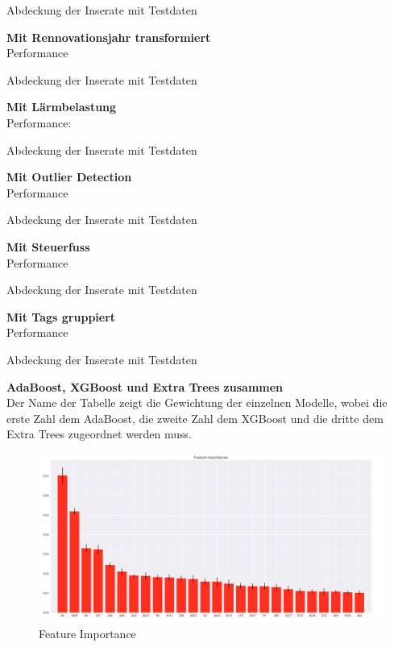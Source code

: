 
Abdeckung der Inserate mit Testdaten


%
\newpage
\textbf{Mit Rennovationsjahr transformiert}\\
Performance


Abdeckung der Inserate mit Testdaten


%
\newpage
\textbf{Mit Lärmbelastung}\\
Performance:


Abdeckung der Inserate mit Testdaten


%
\newpage
\textbf{Mit Outlier Detection}\\
Performance


Abdeckung der Inserate mit Testdaten


%
\newpage
\textbf{Mit Steuerfuss}\\
Performance


Abdeckung der Inserate mit Testdaten


%
\newpage
\textbf{Mit Tags gruppiert}\\
Performance


Abdeckung der Inserate mit Testdaten


%
%
\newpage
\textbf{AdaBoost, XGBoost und Extra Trees zusammen}\\
Der Name der Tabelle zeigt die Gewichtung der einzelnen Modelle, wobei die erste Zahl dem AdaBoost, die zweite Zahl dem XGBoost und die dritte dem Extra Trees zugeordnet werden muss.







\begin{figure}[h]
  \centering
  \includegraphics[width=\linewidth]{images/anhang/ml/Feature_importance_Tree.png}
  \caption{Feature Importance}
\end{figure}

